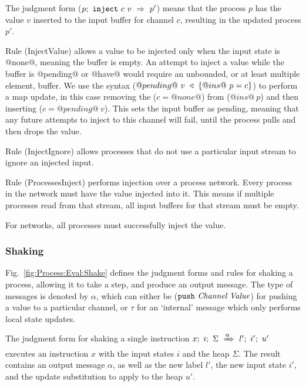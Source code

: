 The judgment form ($\ProcInject{p}{c}{v}{p'}$) means that the process $p$ has the value $v$ inserted to the input buffer for channel $c$, resulting in the updated process $p'$.

Rule (InjectValue) allows a value to be injected only when the input state is @none@, meaning the buffer is empty.
An attempt to inject a value while the buffer is @pending@ or @have@ would require an unbounded, or at least multiple element, buffer.
We use the syntax ($\HeapUpdateOne{@ins@~p}{c}{@pending@~v}$) to perform a map update, in this case removing the ($c=@none@$) from ($@ins@~p$) and then inserting ($c=@pending@~v$).
This sets the input buffer as pending, meaning that any future attempts to inject to this channel will fail, until the process pulls and then drops the value.

Rule (InjectIgnore) allows processes that do not use a particular input stream to ignore an injected input.

Rule (ProcessesInject) performs injection over a process network.
Every process in the network must have the value injected into it.
This means if multiple processes read from that stream, all input buffers for that stream must be empty.

For networks, all processes must successfully inject the value.


\subsubsection{Shaking}
Fig.~\ref{fig:Process:Eval:Shake} defines the judgment forms and rules for shaking a process, allowing it to take a step, and produce an output message.
The type of messages is denoted by $\alpha$, which can either be ($\Push~\Chan~\Value$) for pushing a value to a particular channel, or $\tau$ for an `internal' message which only performs local state updates.


The judgment form for shaking a single instruction $\ProcBlockShake{x}{i}{\Sigma}{\alpha}{l'}{i'}{u'}$
executes an instruction $x$ with the input states $i$ and the heap $\Sigma$.
The result contains an output message $\alpha$, as well as the new label $l'$, the new input state $i'$, and the update substitution to apply to the heap $u'$.

